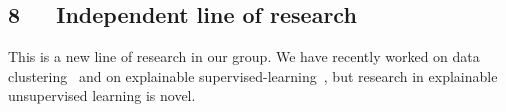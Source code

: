 \documentclass[a4paper,11pt]{article}
\begin{document}
\subsection*{8~~~Independent line of research}


This is a new line of research in our group. 
We have recently worked on data clustering~\cite{spoerhase2023constant,thejaswi2021diversity}
and on explainable supervised-learning~\cite{ciaperoni2023concise,zhang2020diverse,zhang2023regularized}, 
but research in explainable unsupervised learning is novel.


{\small
\setlength{\bibsep}{0pt}


}

% 
\end{document}
